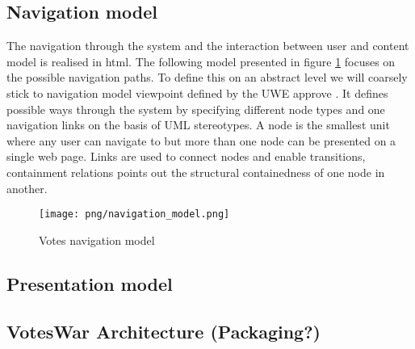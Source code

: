 \subsection{Navigation model}
The navigation through the system and the interaction between user and content model is realised in html. The following model presented in figure \ref{F:navigation_model} focuses on the possible navigation paths. To define this on an abstract level we will coarsely stick to navigation model viewpoint defined by the UWE approve \cite{Uwe08,uweref}. It defines possible ways through the system by specifying different node types and one navigation links on the basis of UML stereotypes. A node is the smallest unit where any user can navigate to but more than one node can be presented on a single web page. Links are used to connect nodes and enable transitions, containment relations points out the structural containedness of one node in another.

\begin{figure}
\centering
\texttt{[image: png/navigation\_model.png]}
\caption{Votes navigation model}
\label{F:navigation_model}
\end{figure}

\subsection{Presentation model}

\subsection{VotesWar Architecture (Packaging?)}
